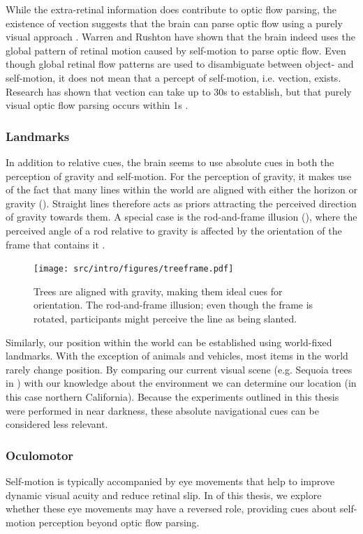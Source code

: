 While the extra-retinal information does contribute to optic flow parsing, the existence of vection \cite{dichgans1978} suggests that the brain can parse optic flow using a purely visual approach \cite{rushton2005,warren2007}. Warren and Rushton \citeyear{warren2009} have shown that the brain indeed uses the global pattern of retinal motion caused by self-motion to parse optic flow. Even though global retinal flow patterns are used to disambiguate between object- and self-motion, it does not mean that a percept of self-motion, i.e. vection, exists. Research has shown that vection can take up to 30s to establish, but that purely visual optic flow parsing occurs within 1s \cite{warren2009}.

\subsubsection{Landmarks}
In addition to relative cues, the brain seems to use absolute cues in both the perception of gravity and self-motion. For the perception of gravity, it makes use of the fact that many lines within the world are aligned with either the horizon or gravity (). Straight lines therefore acts as priors attracting the perceived direction of gravity towards them. A special case is the rod-and-frame illusion (), where the perceived angle of a rod relative to gravity is affected by the orientation of the frame that contains it \cite{witkin1948}.

\begin{figure}
	\texttt{[image: src/intro/figures/treeframe.pdf]}
	\caption{ Trees are aligned with gravity, making them ideal cues for orientation.  The rod-and-frame illusion; even though the frame is rotated, participants might perceive the line as being slanted.}
	\label{intro:fig:treeframe}
\end{figure}

Similarly, our position within the world can be established using world-fixed landmarks. With the exception of animals and vehicles, most items in the world rarely change position. By comparing our current visual scene (e.g. Sequoia trees in ) with our knowledge about the environment we can determine our location (in this case northern California). Because the experiments outlined in this thesis were performed in near darkness, these absolute navigational cues can be considered less relevant.


\subsubsection{Oculomotor}
Self-motion is typically accompanied by eye movements that help to improve dynamic visual acuity and reduce retinal slip. In  of this thesis, we explore whether these eye movements may have a reversed role, providing cues about self-motion perception beyond optic flow parsing.

